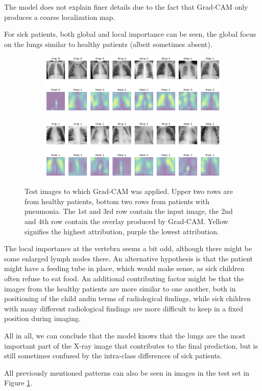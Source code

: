 The model does not explain finer details due to the fact that Grad-CAM only produces a coarse localization map.

For sick patients, both global and local importance can be seen, the global focus on the lungs similar to healthy patients (albeit sometimes absent).

\begin{figure}
    \centering
    \begin{subfigure}{\columnwidth}
        \includegraphics[width=1\textwidth]{images/gc_test.png}
    \end{subfigure}
    \centering
    \begin{subfigure}{\columnwidth}
        \includegraphics[width=1\textwidth]{images/gc_test_P.png}
    \end{subfigure}
    \caption{Test images to which Grad-CAM was applied. Upper two rows are from healthy patients, bottom two rows from patients with pneumonia. The 1st and 3rd row contain the input image, the 2nd and 4th row contain the overlay produced by Grad-CAM. Yellow signifies the highest attribution, purple the lowest attribution.}
    \label{fig:gc_test}
\end{figure}

The local importance at the vertebra seems a bit odd, although there might be some enlarged lymph nodes there. An alternative hypothesis is that the patient might have a feeding tube in place, which would make sense, as sick children often refuse to eat food. An additional contributing factor might be that the images from the healthy patients are more similar to one another, both in positioning of the child andin terms of radiological findings, while sick children with many different radiological findings are more difficult to keep in a fixed position during imaging.

All in all, we can conclude that the model knows that the lungs are the most important part of the X-ray image that contributes to the final prediction, but is still sometimes confused by the intra-class differences of sick patients.

All previously mentioned patterns can also be seen in images in the test set in Figure \ref{fig:gc_test}.